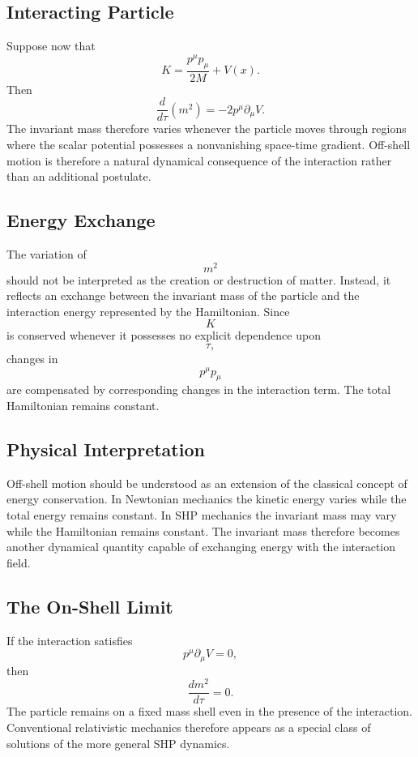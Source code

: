 \subsection{Interacting Particle}
Suppose now that
\[K=\frac{p^\mu p_\mu}{2M}+V(x).\]
Then
\[\boxed{\frac{d}{d\tau}(m^2)=-2p^\mu\partial_\mu V.}\]
The invariant mass therefore varies whenever the particle moves through
regions where the scalar potential possesses a nonvanishing
space-time gradient.
Off-shell motion is therefore a natural dynamical consequence of the
interaction rather than an additional postulate.
\subsection{Energy Exchange}
The variation of
\[m^2\]
should not be interpreted as the creation or destruction of matter.
Instead, it reflects an exchange between the invariant mass of the
particle and the interaction energy represented by the Hamiltonian.
Since
\[K\]
is conserved whenever it possesses no explicit dependence upon
\[\tau,\]
changes in
\[p^\mu p_\mu\]
are compensated by corresponding changes in the interaction term.
The total Hamiltonian remains constant.
\subsection{Physical Interpretation}
Off-shell motion should be understood as an extension of the classical
concept of energy conservation.
In Newtonian mechanics the kinetic energy varies while the total energy
remains constant.
In SHP mechanics the invariant mass may vary while the Hamiltonian
remains constant.
The invariant mass therefore becomes another dynamical quantity capable
of exchanging energy with the interaction field.
\subsection{The On-Shell Limit}
If the interaction satisfies
\[p^\mu\partial_\mu V=0,\]
then
\[\frac{dm^2}{d\tau}=0.\]
The particle remains on a fixed mass shell even in the presence of the
interaction.
Conventional relativistic mechanics therefore appears as a special class
of solutions of the more general SHP dynamics.
